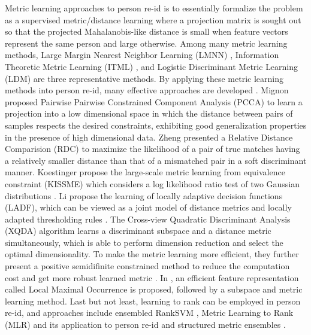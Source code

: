 \documentclass[10pt,journal,twocolumn]{IEEEtran}
\begin{document}
Metric learning approaches to person re-id is  to essentially formalize the problem as a supervised metric/distance learning where a projection matrix is sought out so that the projected Mahalanobis-like distance is small when feature vectors represent the same person and large otherwise. Among many metric learning methods, Large Margin Nearest Neighbor Learning (LMNN) \cite{Weinberger2006Distance}, Information Theoretic Metric Learning (ITML) \cite{Davis2007Information}, and Logistic Discriminant Metric Learning (LDM) \cite{Guillaumin2009Isthatyou} are three representative methods. 
By applying these metric learning methods into person re-id, many effective approaches are developed \cite{Pedagadi2013Local,Kedem2012Nonlinear,Kostinger2012Large,Wu2011Optimizing,Xiong2014Person,LADF,PCCA,Zheng2013PAMI,Hirzer2012Person}. 
Mignon \etal\cite{PCCA} proposed Pairwise Pairwise Constrained Component Analysis (PCCA) to learn a projection into a low dimensional space in which the distance between pairs of samples respects the desired constraints, exhibiting good generalization properties in the presence of high dimensional data. Zheng \etal\cite{Zheng2013PAMI} presented a Relative Distance Comparision (RDC) to maximize the likelihood of a pair of true matches having a relatively smaller distance than that of a mismatched pair in a soft discriminant manner.
Koestinger \etal propose the large-scale metric learning from equivalence constraint (KISSME) which considers a log likelihood ratio test of two Gaussian distributions \cite{Kostinger2012Large}.
Li \etal propose the learning of locally adaptive decision functions (LADF), which can be viewed as a joint model of distance metrics and locally adapted thresholding rules \cite{LADF}. The Cross-view Quadratic Discriminant Analysis (XQDA) algorithm learns a discriminant subspace and a distance metric simultaneously, which is able to perform dimension reduction and select the optimal dimensionality.  To make the metric learning more efficient, they further present a  positive semidifinite constrained method to reduce the computation cost and get more robust learned metric \cite{ReID_structure}. In \cite{LOMOMetric}, an efficient feature representation called Local Maximal Occurrence is proposed, followed by a subspace and metric learning method. Last but not least, learning to rank can be employed in person re-id, and approaches include ensembled RankSVM \cite{Prosser2010Person}, Metric Learning to Rank (MLR) \cite{McFee2010Metric} and its application to person re-id \cite{Wu2011Optimizing} and structured metric ensembles \cite{paul2015ensemble}.
\end{document}
